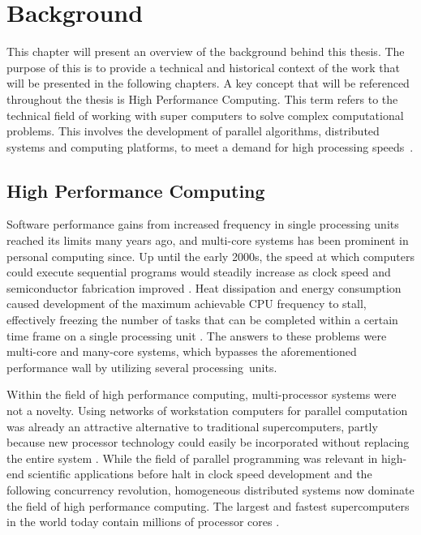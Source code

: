 \documentclass{uit-report}
\begin{document}
\newpage
\mbox{} \pagebreak
\chapter{Background}
This chapter will present an overview of the background behind this thesis. The purpose of this is to provide a technical and historical context of the work that will be presented in the following chapters. A key concept that will be referenced throughout the thesis is High Performance Computing. This term refers to the technical field of working with super computers to solve complex computational problems. This involves the development of parallel algorithms, distributed systems and computing platforms, to meet a demand for high processing speeds~\cite{hpc_def}.

%  
\section{High Performance Computing}

Software performance gains from increased frequency in single processing units reached its limits many years ago, and multi-core systems has been prominent in personal computing since. Up until the early 2000s, the speed at which computers could execute sequential programs would steadily increase as clock speed and semiconductor fabrication improved \cite{sutter_larus_2005}. Heat dissipation and energy consumption caused development of the maximum achievable CPU frequency to stall, effectively freezing the number of tasks that can be completed within a certain time frame on a single processing unit \cite{diaz_munoz-caro_nino_2012}. The answers to these problems were multi-core and many-core systems, which bypasses the aforementioned performance wall by utilizing several processing~units.


Within the field of high performance computing, multi-processor systems were not a novelty. Using networks of workstation computers for parallel computation was already an attractive alternative to traditional supercomputers, partly because new processor technology could easily be incorporated without replacing the entire system \cite{wilkinson_allen_2005}. While the field of parallel programming was relevant in high-end scientific applications before halt in clock speed development and the following concurrency revolution, homogeneous distributed systems now dominate the field of high performance computing. The largest and fastest supercomputers in the world today contain millions of processor cores \cite{top500}.
\end{document}
